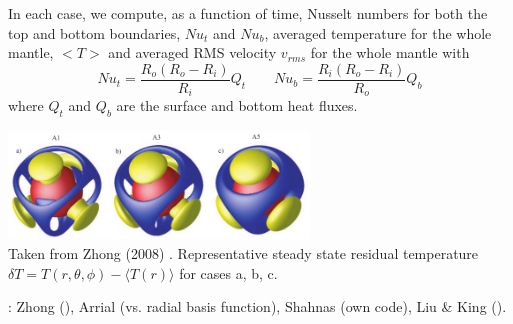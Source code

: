 

In each case, we compute, as a function of time, Nusselt 
numbers for both the top and bottom boundaries, $Nu_t$ and $Nu_b$, 
averaged temperature for
the whole mantle, $<T>$ and averaged RMS velocity $v_{rms}$ for the whole mantle
with
\[
Nu_t=\frac{R_o(R_o-R_i)}{R_i} Q_t
\quad\quad
Nu_b=\frac{R_i(R_o-R_i)}{R_o} Q_b
\]
where $Q_t$ and $Q_b$ are the surface and bottom heat fluxes.

\begin{center}
\includegraphics[width=8cm]{images/benchmark_sscb3D/zhmt08}\\
{\captionfont Taken from Zhong \etal (2008) \cite{zhmt08}. 
Representative steady state residual temperature 
$\delta T = T(r,\theta,\phi)-\langle T(r) \rangle$ for cases a, b, c.}
\end{center}


\Literature: Zhong \etal \cite{zhmt08} (\citcoms), Arrial \etal \cite{arfw14}
(\citcoms vs. radial basis function), Shahnas \etal \cite{shpe15} (own code), 
Liu \& King \cite{liki19} (\aspect).





